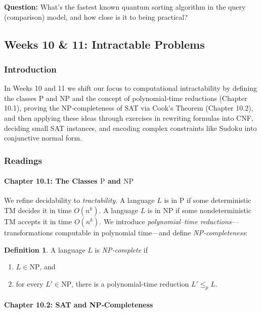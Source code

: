 \documentclass{article}
\theoremstyle{theorem}
\theoremstyle{definition}
\newtheorem{definition}[theorem]{Definition}
\theoremstyle{remark}
\begin{document}
\textbf{Question:} What’s the fastest known quantum sorting algorithm in the query (comparison) model, and how close is it to being practical?

\subsection{Weeks 10 \& 11: Intractable Problems}

\subsubsection{Introduction}
In Weeks 10 and 11 we shift our focus to computational intractability by defining the classes P and NP and the concept of polynomial‐time reductions (Chapter 10.1), proving the NP‐completeness of SAT via Cook’s Theorem (Chapter 10.2), and then applying these ideas through exercises in rewriting formulas into CNF, deciding small SAT instances, and encoding complex constraints like Sudoku into conjunctive normal form.

\subsubsection{Readings}

\paragraph*{Chapter 10.1: The Classes \(\mathrm{P}\) and \(\mathrm{NP}\)}  
We refine decidability to \emph{tractability}.  A language \(L\) is in
\(\mathrm{P}\) if some deterministic TM decides it in time \(O(n^k)\).  A
language \(L\) is in \(\mathrm{NP}\) if some nondeterministic TM accepts
it in time \(O(n^k)\).  We introduce \emph{polynomial–time reductions}—
transformations computable in polynomial time—and define \emph{NP‐completeness}:

\begin{definition}
A language \(L\) is \emph{NP‐complete} if
\begin{enumerate}
  \item \(L\in\mathrm{NP}\), and
  \item for every \(L'\in\mathrm{NP}\), there is a polynomial‐time reduction
    \(L'\le_p L\).
\end{enumerate}
\end{definition}

\paragraph*{Chapter 10.2: SAT and NP‐Completeness}\label{sec:chapter10.2}
\end{document}
